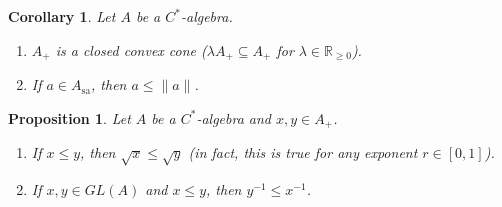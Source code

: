 \documentclass[10pt, a4paper]{article}
\newtheorem{corollary}[thm]{Corollary}
\newtheorem{proposition}[thm]{Proposition}
\newcommand{\R}{\mathbb {R}}
\DeclareMathOperator{\sa}{sa}
\begin{document}
\begin{corollary}
  Let $A$ be a $C^*$-algebra.
  \begin{enumerate}
    \item $A_+$ is a closed convex cone ($\lambda A_+ \subseteq A_+$ for $\lambda \in \R_{\geq 0}$).
    \item If $a \in A_{\sa}$, then $a \leq \|a\|$.
  \end{enumerate}
\end{corollary}

\begin{proposition}
  Let $A$ be a $C^*$-algebra and $x, y \in A_+$.
  \begin{enumerate}
    \item If $x \leq y$, then $\sqrt{x} \leq \sqrt{y}$ (in fact, this is true for any exponent $r \in [0, 1]$).
    \item If $x, y \in GL(A)$ and $x \leq y$, then $y^{-1} \leq x^{-1}$.
  \end{enumerate}
\end{proposition}
\end{document}

